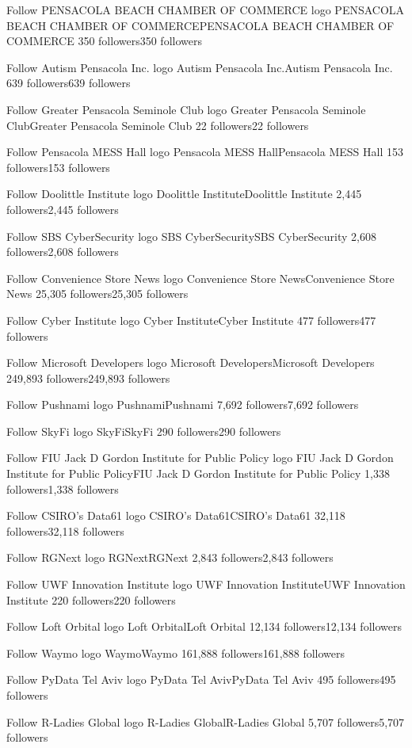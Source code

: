 Follow
PENSACOLA BEACH CHAMBER OF COMMERCE logo
PENSACOLA BEACH CHAMBER OF COMMERCEPENSACOLA BEACH CHAMBER OF COMMERCE
350 followers350 followers

Follow
Autism Pensacola Inc. logo
Autism Pensacola Inc.Autism Pensacola Inc.
639 followers639 followers

Follow
Greater Pensacola Seminole Club logo
Greater Pensacola Seminole ClubGreater Pensacola Seminole Club
22 followers22 followers

Follow
Pensacola MESS Hall logo
Pensacola MESS HallPensacola MESS Hall
153 followers153 followers

Follow
Doolittle Institute logo
Doolittle InstituteDoolittle Institute
2,445 followers2,445 followers

Follow
SBS CyberSecurity logo
SBS CyberSecuritySBS CyberSecurity
2,608 followers2,608 followers

Follow
Convenience Store News logo
Convenience Store NewsConvenience Store News
25,305 followers25,305 followers

Follow
Cyber Institute logo
Cyber InstituteCyber Institute
477 followers477 followers

Follow
Microsoft Developers logo
Microsoft DevelopersMicrosoft Developers
249,893 followers249,893 followers

Follow
Pushnami logo
PushnamiPushnami
7,692 followers7,692 followers

Follow
SkyFi logo
SkyFiSkyFi
290 followers290 followers

Follow
FIU Jack D Gordon Institute for Public Policy logo
FIU Jack D Gordon Institute for Public PolicyFIU Jack D Gordon Institute for Public Policy
1,338 followers1,338 followers

Follow
CSIRO's Data61 logo
CSIRO's Data61CSIRO's Data61
32,118 followers32,118 followers

Follow
RGNext logo
RGNextRGNext
2,843 followers2,843 followers

Follow
UWF Innovation Institute logo
UWF Innovation InstituteUWF Innovation Institute
220 followers220 followers

Follow
Loft Orbital logo
Loft OrbitalLoft Orbital
12,134 followers12,134 followers

Follow
Waymo logo
WaymoWaymo
161,888 followers161,888 followers

Follow
PyData Tel Aviv logo
PyData Tel AvivPyData Tel Aviv
495 followers495 followers

Follow
R-Ladies Global logo
R-Ladies GlobalR-Ladies Global
5,707 followers5,707 followers

